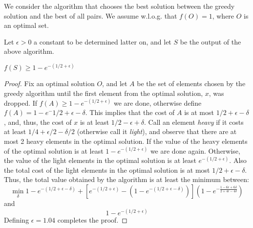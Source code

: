 We consider the algorithm that chooses the best solution between the greedy
solution and the best of all pairs.
We assume w.l.o.g. that $f(O) = 1$, where $O$ is an optimal set.

Let $\epsilon > 0$ a constant to be determined latter on, and let $S$ be the output of 
the above algorithm.
\begin{theorem}
$f(S) \geq 1 - e^{-(1/2 + \epsilon)}$
\end{theorem}

\begin{proof}
Fix an optimal solution $O$, 
and let $A$ be the set of elements chosen by the greedy algorithm 
until the first element from the optimal solution, $x$, was dropped. 
If $f(A) \geq 1 - e^{-(1/2 + \epsilon)}$ we are done, otherwise define 
$f(A) = 1 - e^-{1/2 + \epsilon - \delta}$. 
This implies that the cost of $A$ is at most $1/2 + \epsilon - \delta$, and, thus, the 
cost of $x$ is at least $1/2 - \epsilon + \delta$.
Call an element \emph{heavy} if it costs at least $1/4 + \epsilon/2 - \delta/2$
(otherwise call it \emph{light}), 
and observe that there are at most 2 heavy elements in the optimal solution.
If the value of the heavy elements of the optimal solution 
is at least $1-e^{-(1/2 + \epsilon)}$ we are done again. 
Otherwise, the value of the light elements in the optimal solution 
is at least $e^{-(1/2 + \epsilon)}$.
Also the total cost of the light elements in the optimal solution 
is at most $1/2 + \epsilon - \delta$.
Thus, the total value obtained by the algorithm is at least the minimum between:
$$
\min_\delta
1-e^{-(1/2 + \epsilon - \delta)}
+
\left[
e^{-(1/2 + \epsilon)}
-
(1-e^{-(1/2 + \epsilon - \delta)})
\right]
(1-e^{-\frac{1-6\epsilon + 6\delta}{2 + 4\epsilon - 4\delta}})
$$ 
and
$$
1-e^{-(1/2 + \epsilon)}
$$
Defining $\epsilon = 1.04$ completes the proof. 
\end{proof}
